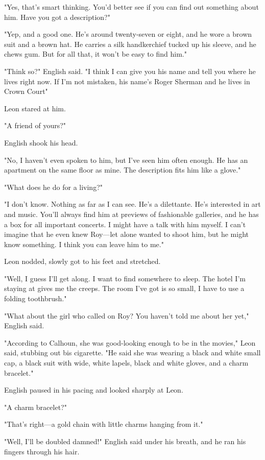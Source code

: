 \documentclass{novel}
\begin{document}
"Yes, that's smart thinking. You'd better see if you can find out something about him. Have you got a description?"

"Yep, and a good one. He's around twenty-seven or \-eight, and he wore a brown suit and a brown hat. He carries a silk handkerchief tucked up his sleeve, and he chews gum. But for all that, it won't be easy to find him."

"Think so?" English said. "I think I can give you his name and tell you where he lives right now. If I'm not mistaken, his name's Roger Sherman and he lives in Crown Court"

Leon stared at him.

"A friend of yours?"

English shook his head.

"No, I haven't even spoken to him, but I've seen him often enough. He has an apartment on the same floor as mine. The description fits him like a glove."

"What does he do for a living?"

"I don't know. Nothing as far as I can see. He's a dilettante. He's interested in art and music. You'll always find him at previews of fashionable galleries, and he has a box for all important concerts. I might have a talk with him myself. I can't imagine that he even knew Roy—let alone wanted to shoot him, but he might know something. I think you can leave him to me."

Leon nodded, slowly got to his feet and stretched.

"Well, I guess I'll get along. I want to find somewhere to sleep. The hotel I'm staying at gives me the creeps. The room I've got is so small, I have to use a folding toothbrush."

"What about the girl who called on Roy? You haven't told me about her yet," English said.

"According to Calhoun, she was good-looking enough to be in the movies," Leon said, stubbing out bis cigarette. "He said she was wearing a black and white small cap, a black suit with wide, white lapels, black and white gloves, and a charm bracelet."

English paused in his pacing and looked sharply at Leon.

"A charm bracelet?"

"That's right—a gold chain with little charms hanging from it."

"Well, I'll be doubled damned!" English said under his breath, and he ran his fingers through his hair.
\end{document}
